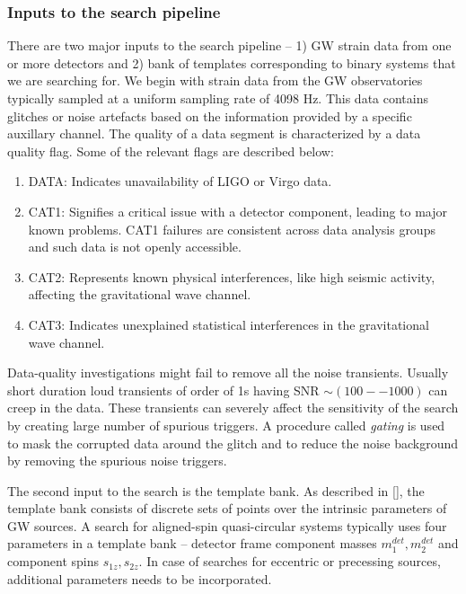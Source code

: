 \subsubsection{Inputs to the search pipeline}
There are two major inputs to the search pipeline -- 1) GW strain data from one or more detectors and 2) bank of templates corresponding to binary systems that we are searching for. We begin with strain data from the GW observatories typically sampled at a uniform sampling rate of 4098 Hz. This data contains glitches or noise artefacts based on the information provided by a specific auxillary channel. The quality of a data segment is characterized by a data quality flag. Some of the relevant flags are described below:
\begin{enumerate}
    \item DATA: Indicates unavailability of LIGO or Virgo data.
    \item CAT1: Signifies a critical issue with a detector component, leading to major known problems. CAT1 failures are consistent across data analysis groups and such data is not openly accessible.
    \item CAT2: Represents known physical interferences, like high seismic activity, affecting the gravitational wave channel.
    \item CAT3: Indicates unexplained statistical interferences in the gravitational wave channel.
\end{enumerate}

Data-quality investigations might fail to remove all the noise transients. Usually short duration loud transients of order of 1s having SNR $\sim (100--1000)$ can creep in the data. These transients can severely affect the sensitivity of the search by creating large number of spurious triggers. A procedure called \textit{gating} is used to mask the corrupted data around the glitch and to reduce the noise background by removing the spurious noise triggers. 

The second input to the search is the template bank. As described in [], the template bank consists of discrete sets of points over the intrinsic parameters of GW sources. A search for aligned-spin quasi-circular systems typically uses four parameters in a template bank -- detector frame component masses $m_{1}^{det}, m_{2}^{det}$ and component spins $s_{1z}, s_{2z}$. In case of searches for eccentric or precessing sources, additional parameters needs to be incorporated. 


